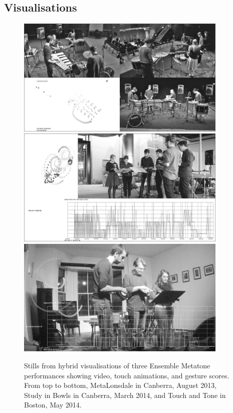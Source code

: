 \documentclass[graybox]{svmult}
\begin{document}
\subsection{Visualisations}
\label{subsec:visualisations}


\begin{figure}
  \centering
  \includegraphics[width=0.9\textwidth]{figures/metatone-visualisation-metalonsdale-bw}
  \includegraphics[width=0.9\textwidth]{figures/metatone-visualisation-youarehere-bw}
  \includegraphics[width=0.9\textwidth]{figures/metatone-visualisation-touchandtone-bw}
  \caption{Stills from hybrid visualisations of three Ensemble Metatone
    performances showing video, touch animations, and gesture scores.
    From top to bottom, MetaLonsdale in Canberra, August 2013, Study
    in Bowls in Canberra, March 2014, and Touch and Tone in Boston,
    May 2014.}
  \label{fig:metatone-visualisations}
\end{figure}
\end{document}
